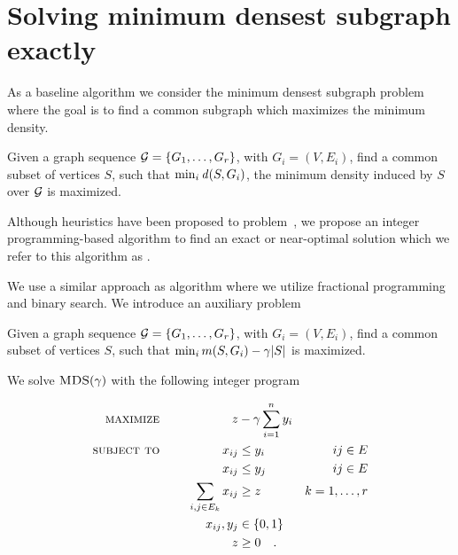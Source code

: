 
\appendix
\section{Solving minimum densest subgraph exactly}

As a baseline algorithm we consider the minimum densest subgraph problem~\cite{jethava2015finding} where the goal is to find a common subgraph which maximizes the minimum density.

\begin{problem}
\label{pr:dcs}
Given a graph sequence ${\mathcal G} = \left\{G_1,\dots,G_r\right\}$, with  $G_i = (V, E_i)$, find a common subset of vertices
$S$, 
such that $\min_i \dens{S, G_i}$, the minimum density induced by  $S$  over  ${\mathcal G}$  is maximized.
\end{problem}
 
Although heuristics have been proposed to  \problemdcs problem~\cite{jethava2015finding, semertzidis2019finding}, we propose an integer programming-based algorithm to find an exact or near-optimal solution which we refer to this algorithm as \algipdcs. 

We use a similar approach as \algipcm algorithm where we utilize fractional programming and binary search. We introduce an auxiliary problem

\begin{problem}[$\problemdcs(\gamma)$]
Given a graph sequence ${\mathcal G} = \left\{G_1,\dots,G_r\right\}$, with  $G_i = (V, E_i)$, find a common subset of vertices
$S$, 
such that $\min_i m(S, G_i) - \gamma {\left|S\right|}$  is maximized.
\end{problem}


We solve $\problemdcs(\gamma)$ with the following integer program

\begin{align*}	\textsc{maximize\,\,\,\,}\hspace{.1in}&&\hspace{.05in}  z &- \gamma \sum_{i = 1}^{n} y_i 
	\\  
	\textsc{subject to}\hspace{.2in} && 
  x_{ij} &\leq y_i &  ij \in E \\
	&& x_{ij} &\leq y_j & ij \in E \\ 
 	&& \sum_{ i, j \in E_k} x_{ij} &\geq z  &  k = 1,\dots, r \\
	&& x_{ij}, y_j &\in \{0,1\}\\
        &&  z & \geq 0 \quad.
\end{align*}


